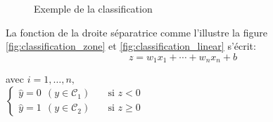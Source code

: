 	
		\begin{figure}[bth]
			\myfloatalign
			 \quad
			
			\caption{Exemple de la classification}\label{fig:classification_2case}
		\end{figure}
		
		La fonction de la droite séparatrice comme l'illustre la figure \ref{fig:classification_zone} et \ref{fig:classification_linear} s'écrit:
		\begin{equation}\label{eq:droite_sep}
			z = w _{1}x_{1}+\cdots +w_{n}x_{n}+b
		\end{equation}
		
		avec $ i=1,\ldots ,n,$ %
		\\
		$
		\begin{cases}
			\hat{y}=0 \ \ (y \in \mathcal{C}_1) & \quad \text{si  } z < 0\\
			\hat{y}=1 \ \ (y \in \mathcal{C}_2) & \quad \text{si  } z \geq 0
		\end{cases}
		$\\
		
